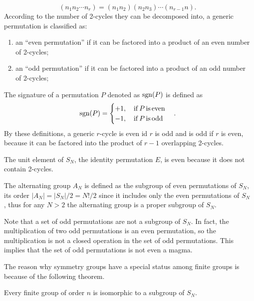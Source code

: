 \begin{equation}
    (n_1n_2\cdots n_r) = (n_1n_2)(n_2n_3)\cdots(n_{r-1}n).
\end{equation}
According to the number of 2-cycles they can be decomposed into, a generic permutation is classified as:
\begin{enumerate}
    \item an ``even permutation'' if it can be factored into a product of an even number of 2-cycles;
    \item an ``odd permutation'' if it can be factored into a product of an odd number of 2-cycles; 
\end{enumerate}
The signature of a permutation $P$ denoted as $\mathrm{sgn}(P)$ is defined as 
\begin{equation}
    \mathrm{sgn}(P) = 
    \begin{cases}
        +1,\quad \mathrm{if}\,P\,\mathrm{is\,even} \\
        -1,\quad \mathrm{if}\,P\,\mathrm{is\,odd}
    \end{cases}.
\end{equation}
By these definitions, a generic $r$-cycle is even id $r$ is odd and is odd if $r$ is even, because it can be factored into the product of $r-1$ overlapping 2-cycles.
\begin{obs}
    The unit element of $S_N$, the identity permutation $E$, is even because it does not contain 2-cycles.
\end{obs}
The alternating group $A_N$ is defined as the subgroup of even permutations of $S_N$, its order $|A_N| = |S_N|/2 = N!/2$ since it includes only the even permutations of $S_N$, thus for any $N > 2$ the alternating group is a proper subgroup of $S_N$.
\begin{obs}
    Note that a set of odd permutations are not a subgroup of $S_N$. In fact, the multiplication of two odd permutations is an even permutation, so the multiplication is not a closed operation in the set of odd permutations. This implies that the set of odd permutations is not even a magma. 
\end{obs}
The reason why symmetry groups have a special status among finite groups is because of the following theorem.
\begin{teo}
    Every finite group of order $n$ is isomorphic to a subgroup of $S_N$.
\end{teo}
